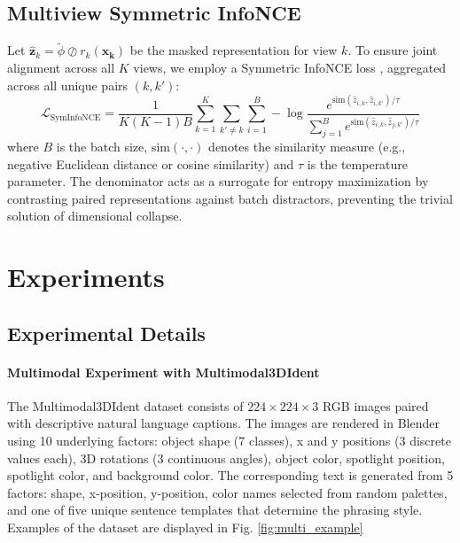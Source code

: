 \documentclass[a4paper,12pt]{article}
\begin{document}
\subsection{Multiview Symmetric InfoNCE}
Let $\hat{\mathbf{z}}_k = \tilde{\phi} \oslash r_k(\mathbf{x_k})$ be the masked representation for view $k$. To ensure joint alignment across all $K$ views, we employ a Symmetric InfoNCE loss \cite{oord2019representationlearningcontrastivepredictive, radford2021learning}, aggregated across all unique pairs $(k, k')$:
\begin{equation}
  \mathcal{L}_{\text{SymInfoNCE}} = \frac{1}{K(K-1)B} \sum_{k=1}^K \sum_{k' \neq k} \sum_{i=1}^B -\log \frac{e^{\text{sim}(\hat{z}_{i,k}, \hat{z}_{i,k'})/\tau}}{\sum_{j=1}^B e^{\text{sim}(\hat{z}_{i,k}, \hat{z}_{j,k'})/\tau}}
\end{equation}
where $B$ is the batch size, $\text{sim}(\cdot, \cdot)$ denotes the similarity measure (e.g., negative Euclidean distance or cosine similarity) and $\tau$ is the temperature parameter. The denominator acts as a surrogate for entropy maximization by contrasting paired representations against batch distractors, preventing the trivial solution of dimensional collapse.

\section{Experiments} \label{app:Exp}

\subsection{Experimental Details} \label{app:ExpDetails}

\paragraph{Multimodal Experiment with Multimodal3DIdent} The Multimodal3DIdent dataset \cite{daunhawer2023identifiabilityresultsmultimodalcontrastive} consists of $224 \times 224 \times 3$ RGB images paired with descriptive natural language captions. The images are rendered in Blender using 10 underlying factors: object shape (7 classes), x and y positions (3 discrete values each), 3D rotations (3 continuous angles), object color, spotlight position, spotlight color, and background color. The corresponding text is generated from 5 factors: shape, x-position, y-position, color names selected from random palettes, and one of five unique sentence templates that determine the phrasing style. Examples of the dataset are displayed in Fig. \ref{fig:multi_example}
\end{document}
